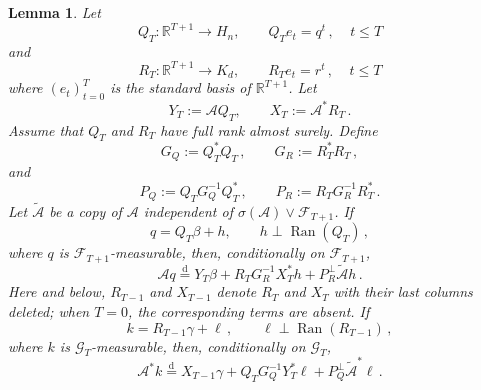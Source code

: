 \documentclass[10pt,a4paper]{amsart}
\newtheorem{lemma}{Lemma}
\begin{document}
\begin{lemma}\label{lem:adaptive-conditioning}
Let
\[
  Q_T:\mathbb R^{T+1}\to H_n,
  \qquad
  Q_Te_t=q^t\,,~~~~~ t \le T 
\]
and
\[
  R_T:\mathbb R^{T+1}\to K_d,
  \qquad
  R_Te_t=r^t\,,~~~~~ t \le T
\]
where $(e_t)_{t=0}^{T}$ is the standard basis of $\mathbb R^{T+1}$.
Let
\[
  Y_T:=\mathcal A Q_T,
  \qquad
  X_T:=\mathcal A^*R_T\,.
\]
Assume that $Q_{T}$ and $R_T$ have full rank almost surely. Define
\[
  G_{Q}:=Q_T^*Q_T\,,
  \qquad
  G_{R}:=R_T^*R_T\,,
\]
and
\[
  P_{Q}:=Q_TG_{Q}^{-1}Q_T^*\,,
  \qquad
  P_{R}:=R_TG_{R}^{-1}R_T^*\,.
\] 
%
Let $\widetilde{\mathcal A}$ be a copy of $\mathcal{A}$ independent of
$\sigma(\mathcal{A}) \vee \mathscr{F}_{T+1}$. If
\[
  q=Q_T\beta+h,
  \qquad
  h\perp \operatorname{Ran}(Q_T)\,,
\]
where $q$ is $\mathscr F_{T+1}$-measurable, then, conditionally on
$\mathscr F_{T+1}$,
\begin{equation}\label{eq:adaptive-domain-vector}
  \mathcal A q
  \stackrel{\mathrm d}{=}
  Y_T\beta
  +
  R_{T}G_{R}^{-1}X_{T}^*h
  +
  P_{R}^\perp\widetilde{\mathcal A}h\,.
\end{equation}
Here and below, $R_{T-1}$ and $X_{T-1}$ denote $R_T$ and $X_T$
with their last columns deleted; when $T=0$, the corresponding terms are
absent.  If
\[
  k=R_{T-1}\gamma+\ell\,,
  \qquad
  \ell\perp \operatorname{Ran}(R_{T-1})\,,
\]
where $k$ is $\mathscr G_T$-measurable, then, conditionally on
$\mathscr G_T$,
\begin{equation}\label{eq:adaptive-range-vector}
  \mathcal A^* k
  \stackrel{\mathrm d}{=}
  X_{T-1}\gamma
  +
  Q_{T}G_{Q}^{-1}Y_{T}^*\ell
  +
  P_{Q}^\perp\widetilde{\mathcal A}^*\ell\,.
\end{equation}
\end{lemma}
\end{document}
